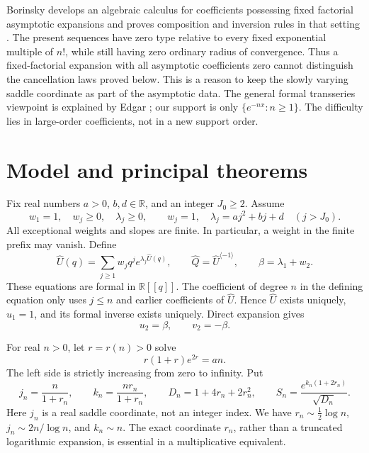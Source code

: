 \documentclass[11pt,a4paper]{article}
\numberwithin{equation}{section}
\theoremstyle{definition}\newtheorem{definition}[theorem]{Definition}
\theoremstyle{remark}\newtheorem{remark}[theorem]{Remark}
\theoremstyle{definition}
\newcommand{\R}{\mathbb R}
\newcommand{\U}{\widehat U}
\newcommand{\Q}{\widehat Q}
\begin{document}
Borinsky develops an algebraic calculus for coefficients possessing
fixed factorial asymptotic expansions and proves composition and inversion
rules in that setting \cite{borinsky}. The present sequences have zero type
relative to every fixed exponential multiple of \(n!\), while still having
zero ordinary radius of convergence. Thus a fixed-factorial expansion with
all asymptotic coefficients zero cannot distinguish the cancellation laws
proved below. This is a reason to keep the slowly varying saddle coordinate
as part of the asymptotic data. The general formal transseries viewpoint is
explained by Edgar \cite{edgar}; our support is only \(\{e^{-nx}:n\ge1\}\).
The difficulty lies in large-order coefficients, not in a new support order.

\section{Model and principal theorems}
\label{sec:main}

Fix real numbers \(a>0\), \(b,d\in\R\), and an integer \(J_0\ge2\).
Assume
\begin{equation}
 w_1=1,\quad w_j\ge0,\quad\lambda_j\ge0,\qquad
 w_j=1,\quad\lambda_j=aj^2+bj+d\quad(j>J_0).
 \label{eq:assumptions}
\end{equation}
All exceptional weights and slopes are finite. In particular, a weight in
the finite prefix may vanish. Define
\begin{equation}
 \U(q)=\sum_{j\ge1}w_jq^j e^{\lambda_j\U(q)},\qquad
 \Q=\U^{\langle-1\rangle},\qquad
 \beta=\lambda_1+w_2.
 \label{eq:model}
\end{equation}
These equations are formal in \(\R[[q]]\). The coefficient of degree \(n\)
in the defining equation only uses \(j\le n\) and earlier coefficients of
\(\U\). Hence \(\U\) exists uniquely, \(u_1=1\), and its formal inverse
exists uniquely. Direct expansion gives
\begin{equation}
 u_2=\beta,\qquad v_2=-\beta.
 \label{eq:beta}
\end{equation}

For real \(n>0\), let \(r=r(n)>0\) solve
\begin{equation}
 r(1+r)e^{2r}=an.
 \label{eq:r}
\end{equation}
The left side is strictly increasing from zero to infinity. Put
\begin{equation}
 j_n=\frac{n}{1+r_n},\qquad k_n=\frac{nr_n}{1+r_n},\qquad
 D_n=1+4r_n+2r_n^2,
 \qquad S_n=\frac{e^{k_n(1+2r_n)}}{\sqrt{D_n}}.
 \label{eq:S}
\end{equation}
Here \(j_n\) is a real saddle coordinate, not an integer index. We have
\(r_n\sim\tfrac12\log n\), \(j_n\sim2n/\log n\), and \(k_n\sim n\).
The exact coordinate \(r_n\), rather than a truncated logarithmic expansion,
is essential in a multiplicative equivalent.
\end{document}
